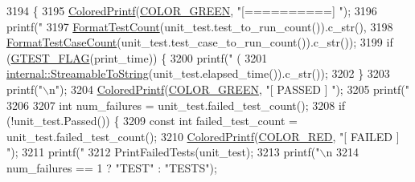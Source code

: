 \begin{DoxyCode}
3194                                                             \{
3195   \hyperlink{namespacetesting_1_1internal_adef3055706176001364e54eb73a87e31}{ColoredPrintf}(\hyperlink{namespacetesting_1_1internal_a648c1bc94c2ef9e868ff3f9dff0f9c4ea3b1e81f5b14a17b35a8672d57d166507}{COLOR\_GREEN},  \textcolor{stringliteral}{"[==========] "});
3196   printf(\textcolor{stringliteral}{"%
3197          \hyperlink{namespacetesting_a7420a0eb48a02ba210e265afb75febdf}{FormatTestCount}(unit\_test.test\_to\_run\_count()).c\_str(),
3198          \hyperlink{namespacetesting_ab8cabb45f3d8c52d336372c1b62d75c5}{FormatTestCaseCount}(unit\_test.test\_case\_to\_run\_count()).c\_str());
3199   \textcolor{keywordflow}{if} (\hyperlink{gtest-port_8h_a828f4e34a1c4b510da50ec1563e3562a}{GTEST\_FLAG}(print\_time)) \{
3200     printf(\textcolor{stringliteral}{" (%
3201            \hyperlink{namespacetesting_1_1internal_aad4beed95d0846e6ffc5da0978ef3bb9}{internal::StreamableToString}(unit\_test.elapsed\_time()).c\_str());
3202   \}
3203   printf(\textcolor{stringliteral}{"\(\backslash\)n"});
3204   \hyperlink{namespacetesting_1_1internal_adef3055706176001364e54eb73a87e31}{ColoredPrintf}(\hyperlink{namespacetesting_1_1internal_a648c1bc94c2ef9e868ff3f9dff0f9c4ea3b1e81f5b14a17b35a8672d57d166507}{COLOR\_GREEN},  \textcolor{stringliteral}{"[  PASSED  ] "});
3205   printf(\textcolor{stringliteral}{"%
3206 
3207   \textcolor{keywordtype}{int} num\_failures = unit\_test.failed\_test\_count();
3208   \textcolor{keywordflow}{if} (!unit\_test.Passed()) \{
3209     \textcolor{keyword}{const} \textcolor{keywordtype}{int} failed\_test\_count = unit\_test.failed\_test\_count();
3210     \hyperlink{namespacetesting_1_1internal_adef3055706176001364e54eb73a87e31}{ColoredPrintf}(\hyperlink{namespacetesting_1_1internal_a648c1bc94c2ef9e868ff3f9dff0f9c4ea9ebb3ddab9391781f6ee5021e1e443c3}{COLOR\_RED},  \textcolor{stringliteral}{"[  FAILED  ] "});
3211     printf(\textcolor{stringliteral}{"%
3212     PrintFailedTests(unit\_test);
3213     printf(\textcolor{stringliteral}{"\(\backslash\)n%
3214                         num\_failures == 1 ? \textcolor{stringliteral}{"TEST"} : \textcolor{stringliteral}{"TESTS"});
}}}}}
\end{DoxyCode}
